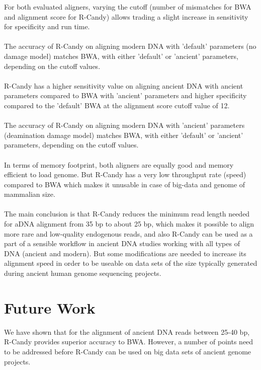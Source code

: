 \documentclass[11pt,a4paper]{report}
\begin{document}
For both evaluated aligners, varying the cutoff (number of mismatches for BWA 
and alignment score for R-Candy) allows trading a slight increase in sensitivity 
for specificity and run time.
\\\\
The accuracy of R-Candy on aligning modern DNA with 'default' parameters (no damage model) 
matches BWA, with either 'default' or 'ancient' parameters, depending  on the cutoff values.
\\\\
R-Candy has a higher sensitivity value on aligning ancient DNA with ancient parameters
compared to BWA with 'ancient' parameters and higher specificity compared to the 
'default' BWA at the alignment score cutoff value of 12.
\\\\
The accuracy of R-Candy on aligning modern DNA with 'ancient' parameters
(deamination damage model) matches BWA, with either 'default' or 'ancient' 
parameters, depending  on the cutoff values.
\\\\
In terms of memory footprint, both aligners are equally good and memory efficient
to load genome. But R-Candy has a very low throughput rate (speed) compared to 
BWA which makes it unusable in case of big-data and genome of mammalian size. 
\\\\
The main conclusion is that R-Candy reduces the minimum read length needed
for aDNA alignment from 35 bp to about 25 bp, which makes it possible to
align more rare and low-quality endogenous reads, and also R-Candy can be 
used as a part of a sensible workflow in ancient DNA studies working with all 
types of DNA (ancient and modern). But some modifications are needed to 
increase its alignment speed in order to be useable on data sets of the
size typically generated during ancient human genome sequencing projects. 



 

\section{Future Work} \label{Future Work}


We have shown that for the alignment of ancient DNA reads between 25-40 
bp, R-Candy provides superior accuracy to BWA. However, a number of points 
need to be addressed before R-Candy can be used on big data sets of ancient
genome projects. 
\end{document}
